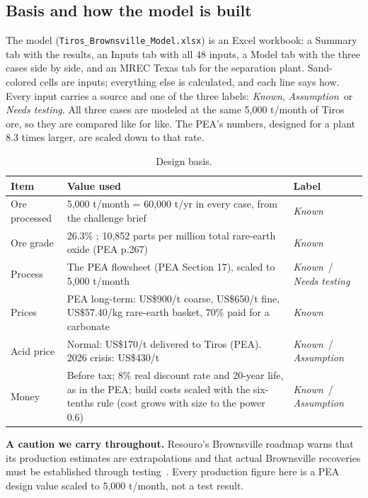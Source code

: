 \documentclass[11pt,letterpaper]{article}
\newcommand{\known}{\textit{\textcolor{oxide}{Known}}}
\newcommand{\assume}{\textit{\textcolor{amber}{Assumption}}}
\newcommand{\test}{\textit{\textcolor{brick}{Needs testing}}}
\newcommand{\usd}[1]{US\$#1}
\newcommand{\tio}{\ce{TiO2}}
\begin{document}
\subsection{Basis and how the model is built}\label{sec:basis}
The model (\texttt{Tiros\_Brownsville\_Model.xlsx}) is an Excel workbook: a Summary tab with the results, an Inputs tab with all 48 inputs, a Model tab with the three cases side by side, and an MREC Texas tab for the separation plant. Sand-colored cells are inputs; everything else is calculated, and each line says how. Every input carries a source and one of the three labels: \known, \assume\ or \test. All three cases are modeled at the same 5,000 t/month of Tiros ore, so they are compared like for like. The PEA's numbers, designed for a plant 8.3 times larger, are scaled down to that rate.

\begin{table}[H]
\centering\small
\caption{Design basis.}\label{tab:basis}
\begin{tabularx}{\linewidth}{@{}p{3.2cm}Lp{2.3cm}@{}}
\toprule
\textbf{Item} & \textbf{Value used} & \textbf{Label}\\
\midrule
Ore processed & 5,000 t/month = 60,000 t/yr in every case, from the challenge brief & \known\\
Ore grade & 26.3\% \tio; 10,852 parts per million total rare-earth oxide (PEA p.267) & \known\\
Process & The PEA flowsheet (PEA Section 17), scaled to 5,000 t/month & \known\ / \test\\
Prices & PEA long-term: \usd{900}/t coarse, \usd{650}/t fine, \usd{57.40}/kg rare-earth basket, 70\% paid for a carbonate & \known\\
Acid price & Normal: \usd{170}/t delivered to Tiros (PEA). 2026 crisis: \usd{430}/t & \known\ / \assume\\
Money & Before tax; 8\% real discount rate and 20-year life, as in the PEA; build costs scaled with the six-tenths rule (cost grows with size to the power 0.6) & \known\ / \assume\\
\bottomrule
\end{tabularx}
\end{table}

\textbf{A caution we carry throughout.} Resouro's Brownsville roadmap warns that its production estimates are extrapolations and that actual Brownsville recoveries must be established through testing~\cite{plan}. Every production figure here is a PEA design value scaled to 5,000 t/month, not a test result.
\end{document}
